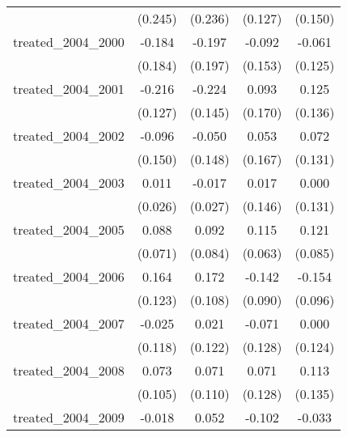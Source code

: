 {\begin{tabular}{l*{4}{c}}
            &     (0.245)         &     (0.236)         &     (0.127)         &     (0.150)         \\
[1em]
treated\_2004\_2000&      -0.184         &      -0.197         &      -0.092         &      -0.061         \\
            &     (0.184)         &     (0.197)         &     (0.153)         &     (0.125)         \\
[1em]
treated\_2004\_2001&      -0.216         &      -0.224         &       0.093         &       0.125         \\
            &     (0.127)         &     (0.145)         &     (0.170)         &     (0.136)         \\
[1em]
treated\_2004\_2002&      -0.096         &      -0.050         &       0.053         &       0.072         \\
            &     (0.150)         &     (0.148)         &     (0.167)         &     (0.131)         \\
[1em]
treated\_2004\_2003&       0.011         &      -0.017         &       0.017         &       0.000         \\
            &     (0.026)         &     (0.027)         &     (0.146)         &     (0.131)         \\
[1em]
treated\_2004\_2005&       0.088         &       0.092         &       0.115         &       0.121         \\
            &     (0.071)         &     (0.084)         &     (0.063)         &     (0.085)         \\
[1em]
treated\_2004\_2006&       0.164         &       0.172         &      -0.142         &      -0.154         \\
            &     (0.123)         &     (0.108)         &     (0.090)         &     (0.096)         \\
[1em]
treated\_2004\_2007&      -0.025         &       0.021         &      -0.071         &       0.000         \\
            &     (0.118)         &     (0.122)         &     (0.128)         &     (0.124)         \\
[1em]
treated\_2004\_2008&       0.073         &       0.071         &       0.071         &       0.113         \\
            &     (0.105)         &     (0.110)         &     (0.128)         &     (0.135)         \\
[1em]
treated\_2004\_2009&      -0.018         &       0.052         &      -0.102         &      -0.033         \\

\end{tabular}}
